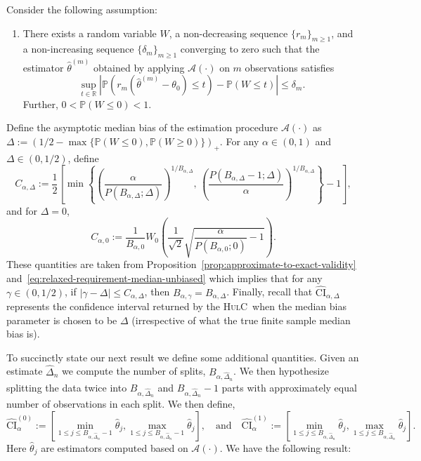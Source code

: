 \documentclass{article}
\newcommand{\hulc}{\textsc{HulC}~}
\numberwithin{myalgctr}{section}
\begin{document}
Consider the following assumption:
\begin{enumerate}[label = \bf(A\arabic*)]
  \item There exists a random variable $W$, a non-decreasing sequence $\{r_m\}_{m\ge1}$, and a non-increasing sequence $\{\delta_m\}_{m\ge1}$ converging to zero such that the estimator $\widehat{\theta}^{(m)}$ obtained by applying $\mathcal{A}(\cdot)$ on $m$ observations satisfies\label{eq:limiting-distribution}
  \[
  \sup_{t\in\mathbb{R}}\left|\mathbb{P}(r_m(\widehat{\theta}^{(m)} - \theta_0) \le t) - \mathbb{P}(W \le t)\right| \le \delta_m.
  \] 
  Further, $0 < \mathbb{P}(W \le 0) < 1$.
\end{enumerate} 
Define the asymptotic median bias of the estimation procedure $\mathcal{A}(\cdot)$ as
$\Delta := \left(1/2 - \max\{\mathbb{P}(W \le 0), \mathbb{P}(W \ge 0)\}\right)_+.$
For any $\alpha\in(0, 1)$ and $\Delta \in (0, 1/2)$, define
\[
C_{\alpha,\Delta} := \frac{1}{2}\left[\min\left\{\left(\frac{\alpha}{P(B_{\alpha,\Delta};\Delta)}\right)^{1/B_{\alpha,\Delta}},\,\left(\frac{P(B_{\alpha,\Delta} - 1; \Delta)}{\alpha}\right)^{1/B_{\alpha,\Delta}}\right\} - 1\right],
\]
and for $\Delta = 0$,
\[
C_{\alpha,0} := \frac{1}{B_{\alpha,0}}W_0\left(\frac{1}{\sqrt{2}}\sqrt{\frac{\alpha}{P(B_{\alpha,0}; 0)} - 1}\right).
\]
These quantities are taken from Proposition~\ref{prop:approximate-to-exact-validity} and~\eqref{eq:relaxed-requirement-median-unbiased} which implies that for any $\gamma\in(0, 1/2)$, if $|\gamma - \Delta| \le C_{\alpha,\Delta}$, then $B_{\alpha,\gamma} = B_{\alpha,\Delta}$. Finally, recall that $\widehat{\mathrm{CI}}_{\alpha,\Delta}$ represents the confidence interval returned by the \hulc when the median bias parameter is chosen to be $\Delta$ (irrespective of what the true finite sample median bias is).

To succinctly state our next result we define some additional quantities.
Given an estimate $\widehat{\Delta}_n$ we compute the number of splits, $B_{\alpha,\widehat{\Delta}_n}$. 
We then hypothesize splitting the data twice into $B_{\alpha,\widehat{\Delta}_n}$ and $B_{\alpha,\widehat{\Delta}_n} - 1$ parts with approximately equal number of observations in each split. We then define,
  \[
  \widehat{\mathrm{CI}}_{\alpha}^{(0)} := \left[\min_{1\le j\le B_{\alpha,\widehat{\Delta}_n} - 1}\widehat{\theta}_j, \max_{1\le j\le B_{\alpha,\widehat{\Delta}_n} - 1}\widehat{\theta}_j\right],\quad\mbox{and}\quad \widehat{\mathrm{CI}}_{\alpha}^{(1)} := \left[\min_{1\le j\le B_{\alpha,\widehat{\Delta}_n}}\widehat{\theta}_j, \max_{1\le j\le B_{\alpha,\widehat{\Delta}_n}}\widehat{\theta}_j\right].
  \]
  Here $\widehat{\theta}_j$ are estimators computed based on $\mathcal{A}(\cdot)$. We have the following result:
\end{document}
